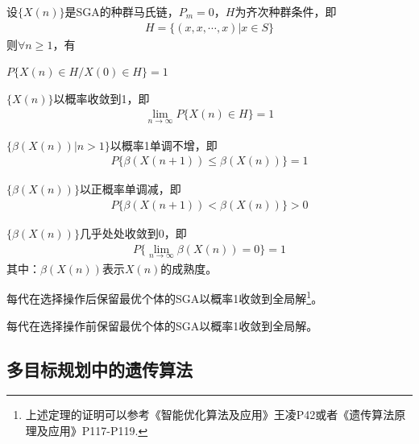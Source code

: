         \begin{theorem}
        设$\{X(n)\}$是SGA的种群马氏链，$P_m=0$，$H$为齐次种群条件，即
        \begin{align*}
        H=\{(x,x,\cdots,x)|x\in S\}
        \end{align*}
        则$\forall n\geqslant 1$，有
        \par
        $P\{X(n)\in H/X(0)\in H\}=1$
        \par
        $\{X(n)\}$以概率收敛到1，即
        \begin{align*}
        \mathop{\lim}\limits_{n\to \infty}P\{X(n)\in H\}=1
        \end{align*}
        \par
        $\{\beta(X(n))|n>1\}$以概率1单调不增，即
        \begin{align*}
        P\{\beta \left(X(n+1)\right)\leqslant \beta \left(X(n)\right)\}=1
        \end{align*}
        \par
        $\{\beta(X(n))\}$以正概率单调减，即
        \begin{align*}
        P\{\beta \left(X(n+1)\right)< \beta \left(X(n)\right)\}>0
        \end{align*}
        \par
        $\{\beta(X(n))\}$几乎处处收敛到0，即
        \begin{align*}
        P\{\mathop{\lim}\limits_{n\to \infty}\beta \left(X(n)\right) = 0 \} = 1
        \end{align*}
        其中：$\beta\left(X(n)\right)$表示$X(n)$的成熟度。
        \end{theorem}
        \begin{theorem}
        每代在选择操作后保留最优个体的SGA以概率1收敛到全局解\footnote{上述定理的证明可以参考《智能优化算法及应用》王凌P42或者《遗传算法原理及应用》P117-P119.}。
        \end{theorem}
        \begin{theorem}
        每代在选择操作前保留最优个体的SGA以概率1收敛到全局解。
        \end{theorem}
    \subsection{多目标规划中的遗传算法}
